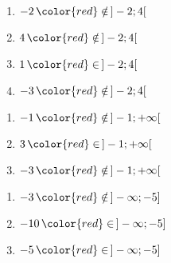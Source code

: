 \documentclass[a4paper,dvipsnames]{article}
\begin{document}
\begin{multicols}{4}
  \begin{enumerate}
    \item [] $-2{\,\color{red}\notin\,}]-2;4[$ \columnbreak
    \item [] $4{\,\color{red}\notin\,}]-2;4[$\columnbreak
    \item [] $1{\,\color{red}\in\,}]-2;4[$\columnbreak
    \item [] $-3{\,\color{red}\notin\,}]-2;4[$
  \end{enumerate}
\end{multicols}

\begin{multicols}{4}
  \begin{enumerate}
    \item [] $-1{\,\color{red}\notin\,}]-1;+\infty[$ \columnbreak
    \item [] $3{\,\color{red}\in\,}]-1;+\infty[$ \columnbreak
    \item [] $-3{\,\color{red}\notin\,}]-1;+\infty[$ 
  \end{enumerate}
\end{multicols}

\begin{multicols}{4}
  \begin{enumerate}
    \item [] $-3{\,\color{red}\notin\,}]-\infty;-5]$\columnbreak
    \item [] $-10{\,\color{red}\in\,}]-\infty;-5]$\columnbreak
    \item [] $-5{\,\color{red}\in\,}]-\infty;-5]$
  \end{enumerate}
\end{multicols}

\bigskip
\end{document}
